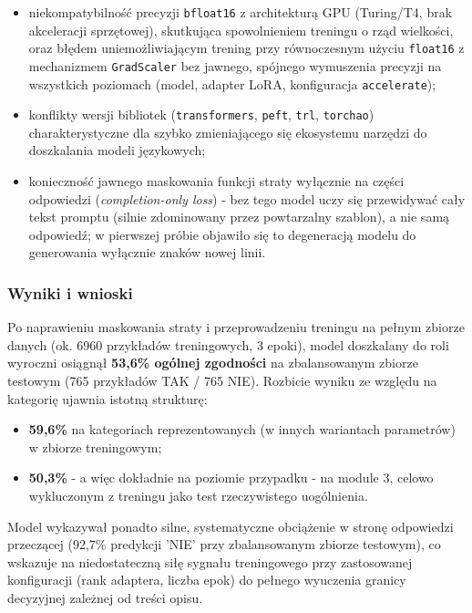 \documentclass[12pt]{article}
\begin{document}
\begin{itemize}
    \item niekompatybilność precyzji \texttt{bfloat16} z architekturą GPU (Turing/T4, brak akceleracji sprzętowej), skutkująca spowolnieniem treningu o rząd wielkości, oraz błędem uniemożliwiającym trening przy równoczesnym użyciu \texttt{float16} z mechanizmem \texttt{GradScaler} bez jawnego, spójnego wymuszenia precyzji na wszystkich poziomach (model, adapter LoRA, konfiguracja \texttt{accelerate});
    \item konflikty wersji bibliotek (\texttt{transformers}, \texttt{peft}, \texttt{trl}, \texttt{torchao}) charakterystyczne dla szybko zmieniającego się ekosystemu narzędzi do doszkalania modeli językowych;
    \item konieczność jawnego maskowania funkcji straty wyłącznie na części odpowiedzi (\emph{completion-only loss}) - bez tego model uczy się przewidywać cały tekst promptu (silnie zdominowany przez powtarzalny szablon), a nie samą odpowiedź; w pierwszej próbie objawiło się to degeneracją modelu do generowania wyłącznie znaków nowej linii.
\end{itemize}

\subsubsection{Wyniki i wnioski}

Po naprawieniu maskowania straty i przeprowadzeniu treningu na pełnym zbiorze danych (ok. 6960 przykładów treningowych, 3 epoki), model doszkalany do roli wyroczni osiągnął \textbf{53,6\% ogólnej zgodności} na zbalansowanym zbiorze testowym (765 przykładów TAK / 765 NIE). Rozbicie wyniku ze względu na kategorię ujawnia istotną strukturę:

\begin{itemize}
    \item \textbf{59,6\%} na kategoriach reprezentowanych (w innych wariantach parametrów) w zbiorze treningowym;
    \item \textbf{50,3\%} - a więc dokładnie na poziomie przypadku - na module 3, celowo wykluczonym z treningu jako test rzeczywistego uogólnienia.
\end{itemize}

Model wykazywał ponadto silne, systematyczne obciążenie w stronę odpowiedzi przeczącej (92,7\% predykcji 'NIE' przy zbalansowanym zbiorze testowym), co wskazuje na niedostateczną siłę sygnału treningowego przy zastosowanej konfiguracji (rank adaptera, liczba epok) do pełnego wyuczenia granicy decyzyjnej zależnej od treści opisu.
\end{document}
